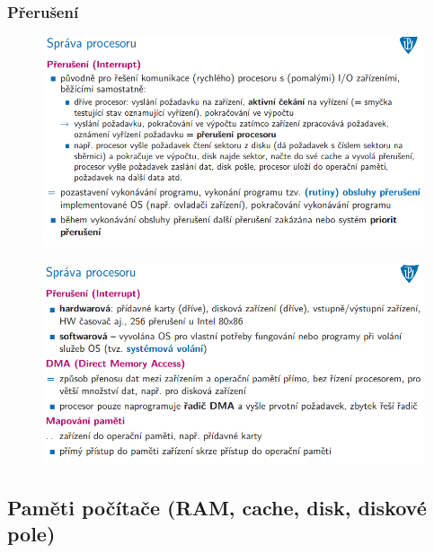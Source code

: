 \documentclass[10pt,a4paper]{article}
\begin{document}
\clearpage
\subsubsection{Přerušení}
\begin{figure} [h]
	\includegraphics[scale=0.65]{img/prvni_odstavec/otazka5/preruseni1.png}	
\end{figure}

\begin{figure} [h]
	\includegraphics[scale=0.65]{img/prvni_odstavec/otazka5/preruseni2.png}	
\end{figure}


\clearpage
\subsection{Paměti počítače (RAM, cache, disk, diskové pole)}
\end{document}
